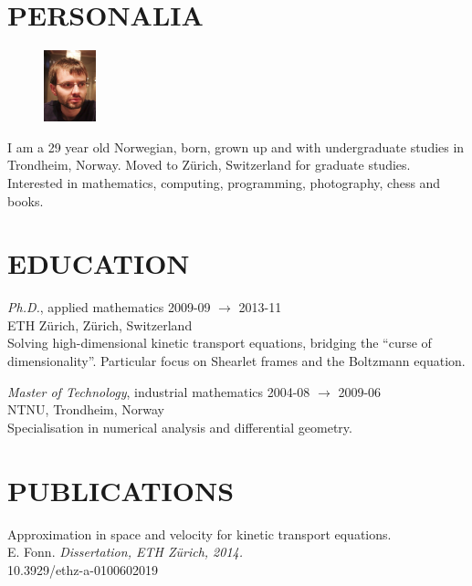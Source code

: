 \documentclass[line,margin]{res}
\newcommand{\zh}{Z\"{u}rich}
\begin{document}
\address{Høgreina 394, NO-7079 Flatåsen}
\address{+41 78 634 68 37, evfonn@gmail.com}


\begin{resume}

\section{PERSONALIA}

\begin{figure}
  \vspace{-0.6cm}
  \includegraphics[width=1.5cm]{photo.png}
\end{figure}

I am a 29 year old Norwegian, born, grown up and with undergraduate studies in Trondheim,
Norway. Moved to Zürich, Switzerland for graduate studies. Interested in mathematics, computing,
programming, photography, chess and books.


\section{EDUCATION} 

{\em Ph.D.}, applied mathematics \hfill 2009-09 $\to$ 2013-11 \\
ETH \zh, \zh, Switzerland \\
Solving high-dimensional kinetic transport equations, bridging the ``curse of
dimensionality''. Particular focus on Shearlet frames and the Boltzmann equation.

{\em Master of Technology}, industrial mathematics \hfill 2004-08 $\to$ 2009-06 \\
NTNU, Trondheim, Norway \\
Specialisation in numerical analysis and differential geometry.


\section{PUBLICATIONS}

Approximation in space and velocity for kinetic transport equations. \\
E. Fonn. {\em Dissertation, ETH \zh, 2014.} \\
10.3929/ethz-a-0100602019


\end{resume}
\end{document}
